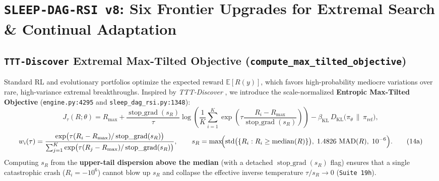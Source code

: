 \documentclass[11pt,a4paper]{article}
\begin{document}
\section{\texttt{SLEEP-DAG-RSI v8}: Six Frontier Upgrades for Extremal Search \& Continual Adaptation}
\label{sec:v8}

\subsection{\texttt{TTT-Discover} Extremal Max-Tilted Objective (\texttt{compute\_max\_tilted\_objective})}

Standard RL and evolutionary portfolios optimize the expected reward $\mathbb{E}[R(y)]$, which favors high-probability mediocre variations over rare, high-variance extremal breakthroughs. Inspired by \emph{TTT-Discover} \cite{tttdiscover2026,sun2024}, we introduce the scale-normalized \textbf{Entropic Max-Tilted Objective} (\texttt{engine.py:4295} and \texttt{sleep\_dag\_rsi.py:1348}):
\begin{equation}
J_\tau(R; \theta) = R_{\max} + \frac{\operatorname{stop\_grad}(s_R)}{\tau} \log \left(\frac{1}{K}\sum_{i=1}^K \exp\!\left(\tau \frac{R_i - R_{\max}}{\operatorname{stop\_grad}(s_R)}\right)\right) - \beta_{\text{KL}}\,D_{\text{KL}}\bigl(\pi_\theta \,\|\, \pi_{\text{ref}}\bigr),
\tag{14}\label{eq:max_tilt}
\end{equation}
\begin{equation}
w_i(\tau) = \frac{\exp\bigl(\tau (R_i - R_{\max})/\operatorname{stop\_grad}(s_R)\bigr)}{\sum_{j=1}^K \exp\bigl(\tau (R_j - R_{\max})/\operatorname{stop\_grad}(s_R)\bigr)}, \qquad s_R = \max\!\Bigl(\operatorname{std}\bigl(\{R_i : R_i \ge \operatorname{median}(R)\}\bigr),\; 1.4826\,\operatorname{MAD}(R),\; 10^{-6}\Bigr).
\tag{14a}\label{eq:max_tilt_weights}
\end{equation}
Computing $s_R$ from the \textbf{upper-tail dispersion above the median} (with a detached $\operatorname{stop\_grad}(s_R)$ flag) ensures that a single catastrophic crash ($R_i = -10^6$) cannot blow up $s_R$ and collapse the effective inverse temperature $\tau / s_R \to 0$ (\texttt{Suite 19h}).
\end{document}
